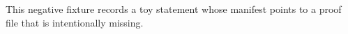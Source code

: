This negative fixture records a toy statement whose manifest points to a proof file that is intentionally missing.

